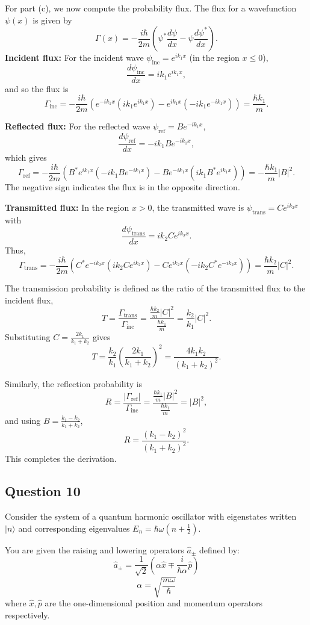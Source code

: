 \documentclass{article}
\begin{document}
\vspace{2mm}

For part (c), we now compute the probability flux. The flux for a wavefunction \( \psi(x) \) is given by
\[
\Gamma(x)=-\frac{i\hbar}{2m}\left(\psi^*\frac{d\psi}{dx}-\psi\frac{d\psi^*}{dx}\right).
\]
\textbf{Incident flux:} For the incident wave \( \psi_{\text{inc}}=e^{ik_1x} \) (in the region \( x\le 0 \)),
\[
\frac{d\psi_{\text{inc}}}{dx}=ik_1e^{ik_1x},
\]
and so the flux is
\[
\Gamma_{\text{inc}} = -\frac{i\hbar}{2m}\left(e^{-ik_1x}(ik_1e^{ik_1x})-e^{ik_1x}(-ik_1e^{-ik_1x})\right)
=\frac{\hbar k_1}{m}.
\]

\textbf{Reflected flux:} For the reflected wave \( \psi_{\text{ref}}=Be^{-ik_1x} \),
\[
\frac{d\psi_{\text{ref}}}{dx}=-ik_1Be^{-ik_1x},
\]
which gives
\[
\Gamma_{\text{ref}} = -\frac{i\hbar}{2m}\left(B^*e^{ik_1x}(-ik_1Be^{-ik_1x})-Be^{-ik_1x}(ik_1B^*e^{ik_1x})\right)
=-\frac{\hbar k_1}{m}|B|^2.
\]
The negative sign indicates the flux is in the opposite direction.

\textbf{Transmitted flux:} In the region \( x>0 \), the transmitted wave is \( \psi_{\text{trans}}=Ce^{ik_2x} \) with
\[
\frac{d\psi_{\text{trans}}}{dx}=ik_2Ce^{ik_2x}.
\]
Thus,
\[
\Gamma_{\text{trans}} = -\frac{i\hbar}{2m}\left(C^*e^{-ik_2x}(ik_2Ce^{ik_2x})-Ce^{ik_2x}(-ik_2C^*e^{-ik_2x})\right)
=\frac{\hbar k_2}{m}|C|^2.
\]

The transmission probability is defined as the ratio of the transmitted flux to the incident flux,
\[
T=\frac{\Gamma_{\text{trans}}}{\Gamma_{\text{inc}}}=\frac{\frac{\hbar k_2}{m}|C|^2}{\frac{\hbar k_1}{m}}=\frac{k_2}{k_1}|C|^2.
\]
Substituting \( C=\frac{2k_1}{k_1+k_2} \) gives
\[
T=\frac{k_2}{k_1}\left(\frac{2k_1}{k_1+k_2}\right)^2=\frac{4k_1k_2}{(k_1+k_2)^2}.
\]

Similarly, the reflection probability is
\[
R=\frac{|\Gamma_{\text{ref}}|}{\Gamma_{\text{inc}}}=\frac{\frac{\hbar k_1}{m}|B|^2}{\frac{\hbar k_1}{m}}=|B|^2,
\]
and using \( B=\frac{k_1-k_2}{k_1+k_2} \),
\[
R=\frac{(k_1-k_2)^2}{(k_1+k_2)^2}.
\]
This completes the derivation.

\subsection{Question 10}

Consider the system of a quantum harmonic oscillator with eigenstates written \(|n\rangle\) and corresponding eigenvalues \(E_n = \hbar\omega(n + \frac{1}{2})\). 

You are given the raising and lowering operators \(\hat{a}_\pm\) defined by:
\[
\hat{a}_\pm = \frac{1}{\sqrt{2}} \left(\alpha \hat{x} \mp \frac{i}{\hbar \alpha} \hat{p}\right)
\]
\[
\alpha = \sqrt{\frac{m\omega}{\hbar}}
\]
where \(\hat{x}, \hat{p}\) are the one-dimensional position and momentum operators respectively.
\end{document}
